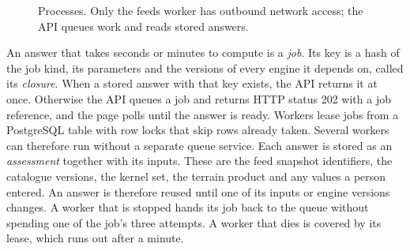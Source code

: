 \documentclass[11pt,a4paper]{article}
\begin{document}
\begin{figure}[htbp]
\centering
{}
\caption{Processes. Only the feeds worker has outbound network access; the API queues
work and reads stored answers.}
\label{fig:arch}
\end{figure}

An answer that takes seconds or minutes to compute is a \emph{job}. Its key is a hash of the job kind, its parameters and the
versions of every engine it depends on, called its \emph{closure}. When a stored answer
with that key exists, the API returns it at once. Otherwise the API queues a job and
returns HTTP status 202 with a job reference, and the page polls until the answer is
ready. Workers lease jobs from a PostgreSQL table with row locks that skip rows already
taken. Several workers can therefore run without a separate queue service. Each answer is stored
as an \emph{assessment} together with its inputs. These are the feed snapshot identifiers,
the catalogue versions, the kernel set, the terrain product and any values a person entered. An
answer is therefore reused until one of its inputs or engine versions changes. A worker
that is stopped hands its job back to the queue without spending one of the job's three
attempts. A worker that dies is covered by its lease, which runs out after a minute.
\end{document}
